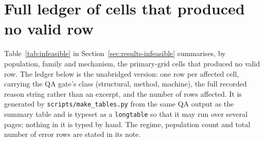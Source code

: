 \section{Full ledger of cells that produced no valid row}
\label{app:infeasible}

Table~\ref{tab:infeasible} in Section~\ref{sec:results-infeasible}
summarises, by population, family and mechanism, the primary-grid cells
that produced no valid row. The ledger below is the unabridged version:
one row per affected cell, carrying the QA gate's class (structural,
method, machine), the full recorded reason string rather than an excerpt,
and the number of rows affected. It is generated by
\texttt{scripts/make\_tables.py} from the same QA output as the summary
table and is typeset as a \texttt{longtable} so that it may run over
several pages; nothing in it is typed by hand. The regime, population
count and total number of error rows are stated in its note.

